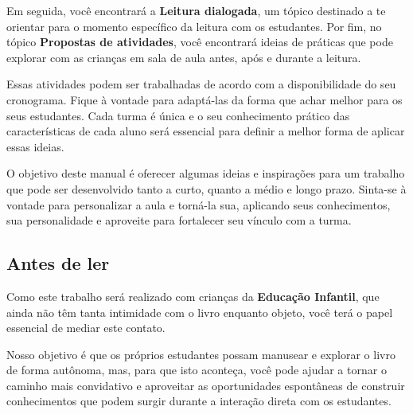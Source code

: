 \documentclass[11pt]{extarticle}
\begin{document}
Em seguida, você encontrará a \textbf{Leitura dialogada}, um 
tópico destinado a te orientar para o momento específico da 
leitura com os estudantes. Por fim, no tópico 
\textbf{Propostas de atividades}, você encontrará ideias 
de práticas que pode explorar com as crianças em sala de 
aula antes, após e durante a leitura. 

Essas atividades podem ser trabalhadas de acordo com a 
disponibilidade do seu cronograma. Fique à vontade para adaptá-las 
da forma que achar melhor para os seus estudantes. Cada turma é única 
e o seu conhecimento prático das características de cada aluno será 
essencial para definir a melhor forma de aplicar essas ideias. 

O objetivo deste manual é oferecer algumas ideias 
e inspirações para um trabalho que pode ser desenvolvido tanto 
a curto, quanto a médio e longo prazo. Sinta-se à vontade para 
personalizar a aula e torná-la sua, aplicando seus conhecimentos, sua 
personalidade e aproveite para fortalecer 
seu vínculo com a turma.


\subsection{Antes de ler}


Como este trabalho será realizado com crianças da \textbf{Educação Infantil}, 
que ainda não têm tanta intimidade com o livro enquanto objeto, você terá o 
papel essencial de mediar este contato. 

Nosso objetivo é que os próprios estudantes possam manusear e explorar o livro de forma autônoma, mas, para que isto aconteça, você pode ajudar a tornar o caminho mais convidativo e aproveitar as oportunidades espontâneas de construir conhecimentos que podem surgir durante a interação direta com os estudantes.


\end{document}
